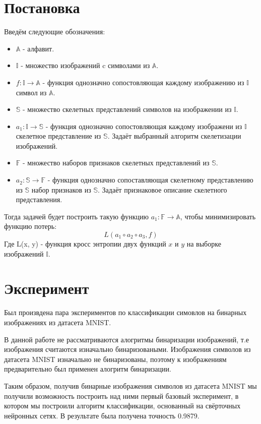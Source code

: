 \documentclass{llncs}
\begin{document}
\section{Постановка}

Введём следующие обозначения:

\begin{itemize}
\item $\mathbb{A}$ - алфавит.
\item $\mathbb{I}$ - множество изображений c символами из $\mathbb{A}$.
\item $f: \mathbb{I} \rightarrow \mathbb{A}$ - функция однозначно сопостовляющая каждому изображению из $\mathbb{I}$ символ из $\mathbb{A}$.
\item $\mathbb{S}$ - множество скелетных представлений символов на изображении из $\mathbb{I}$.
\item $a_1: \mathbb{I} \rightarrow \mathbb{S}$ - функция однозначно сопостовляющая каждому изображени из $\mathbb{I}$ скелетное представление из $\mathbb{S}$. Задаёт выбранный алгоритм скелетизации изображений.
\item $\mathbb{F}$ - множество наборов признаков скелетных представлений из $\mathbb{S}$.
\item $a_2: \mathbb{S} \rightarrow \mathbb{F}$ - функция однозначно сопоставляющая скелетному представлению из $\mathbb{S}$ набор признаков из $\mathbb{S}$. Задаёт признаковое описание скелетного представления.
\end{itemize}

Тогда задачей будет построить такую функцию $a_1: \mathbb{F} \rightarrow \mathbb{A}$, чтобы минимизировать функцию потерь:
$$L(a_1 \circ a_2 \circ a_3, f)$$
Где L(x, y) - функция кросс энтропии двух функций $x$ и $y$ на выборке изображений $\mathbb{I}$.

\section{Эксперимент}

Был произвдена пара экспериментов по классификации симовлов на бинарных изображениях из датасета MNIST.

В данной работе не рассматриваются алогритмы бинаризации изображений, т.е изображения считаются изначально бинаризоваными. Изображения символов из датасета MNIST изначально не бинаризованы, поэтому к изображениям предварительно был применен алогритм бинаризации.

Таким образом, получив бинарные изображения символов из датасета MNIST мы получили возможность построить над ними первый базовый эксперимент, в котором мы построили алгоритм классификации, основанный на свёрточных нейронных сетях. В результате была получена точность 0.9879.
\end{document}
